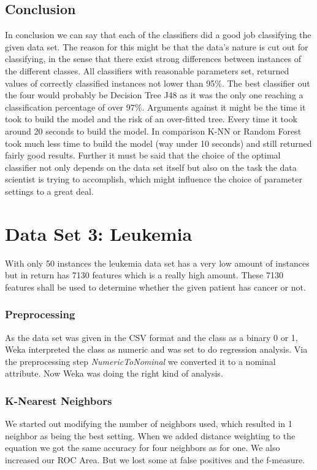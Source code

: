\documentclass{article}
\begin{document}
\subsection{Conclusion}
In conclusion we can say that each of the classifiers did a good job classifying the given data set. The reason for this might be that the data's nature is cut out for classifying, in the sense that there exist strong differences between instances of the different classes. All classifiers with reasonable parameters set, returned values of correctly classified instances not lower than 95\%. The best classifier out the four would probably be Decision Tree J48 as it was the only one reaching a classification percentage of over 97\%. Arguments against it might be the time it took to build the model and the risk of an over-fitted tree. Every time it took around 20 seconds to build the model. In comparison K-NN or Random Forest took much less time to build the model (way under 10 seconds) and still returned fairly good results. Further it must be said that the choice of the optimal classifier not only depends on the data set itself but also on the task the data scientist is trying to accomplish, which might influence the choice of parameter settings to a great deal.   

\section{Data Set 3: Leukemia}
With only 50 instances the leukemia data set has a very low amount of instances but in return has 7130 features which is a really high amount. These 7130 features shall be used to determine whether the given patient has cancer or not.  \\
\subsubsection{Preprocessing}
As the data set was given in the CSV format and the class as a binary 0 or 1, Weka interpreted the class as numeric and was set to do regression analysis. Via the preprocessing step \emph{NumericToNominal} we converted it to a nominal attribute. Now Weka was doing the right kind of analysis.
\subsubsection{K-Nearest Neighbors}
We started out modifying the number of neighbors used, which resulted in 1 neighbor as being the best setting. When we added distance weighting to the equation we got the same accuracy for four neighbors as for one. We also increased our ROC Area.  But we lost some at false positives and the f-measure. \\
\end{document}
